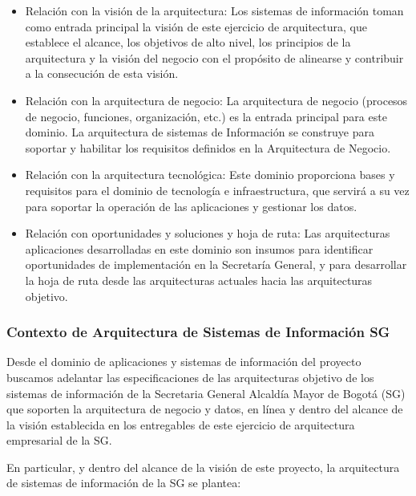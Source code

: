 \documentclass[
	a4paper, %
	12pt, %
]{include/CSSullivanBusinessReport}
\def\tightlist{}
\begin{document}
\begin{itemize}
\tightlist
\item
  Relación con la visión de la arquitectura: Los sistemas de información
  toman como entrada principal la visión de este ejercicio de
  arquitectura, que establece el alcance, los objetivos de alto nivel,
  los principios de la arquitectura y la visión del negocio con el
  propósito de alinearse y contribuir a la consecución de esta visión.
\item
  Relación con la arquitectura de negocio: La arquitectura de negocio
  (procesos de negocio, funciones, organización, etc.) es la entrada
  principal para este dominio. La arquitectura de sistemas de
  Información se construye para soportar y habilitar los requisitos
  definidos en la Arquitectura de Negocio.
\item
  Relación con la arquitectura tecnológica: Este dominio proporciona
  bases y requisitos para el dominio de tecnología e infraestructura,
  que servirá a su vez para soportar la operación de las aplicaciones y
  gestionar los datos.
\item
  Relación con oportunidades y soluciones y hoja de ruta: Las
  arquitecturas aplicaciones desarrolladas en este dominio son insumos
  para identificar oportunidades de implementación en la Secretaría
  General, y para desarrollar la hoja de ruta desde las arquitecturas
  actuales hacia las arquitecturas objetivo.
\end{itemize}

\subsubsection{Contexto de Arquitectura de Sistemas de Información
SG}\label{sec:contexto-de-arquitectura-de-sistemas-de-informaciuxf3n-sg}

Desde el dominio de aplicaciones y sistemas de información del proyecto
buscamos adelantar las especificaciones de las arquitecturas objetivo de
los sistemas de información de la Secretaria General Alcaldía Mayor de
Bogotá (SG) que soporten la arquitectura de negocio y datos, en línea y
dentro del alcance de la visión establecida en los entregables de este
ejercicio de arquitectura empresarial de la SG.

En particular, y dentro del alcance de la visión de este proyecto, la
arquitectura de sistemas de información de la SG se plantea:
\end{document}
